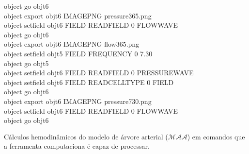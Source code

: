 \documentclass[a4paper,12pt]{monografia}
\theoremstyle{plain}
\theoremstyle{definition}
\theoremstyle{remark}
\begin{document}
\begin{appendices}
\begin{algorithm}[H]
{		object go obj\underline{\space\space}t6 \\
		object export obj\underline{\space\space}t6 IMAGE\underline{\space\space}PNG pressure\underline{\space\space}3\underline{\space\space}65.png \\
		object set\underline{\space\space}field obj\underline{\space\space}t6 FIELD READ\underline{\space\space}FIELD 0 FLOW\underline{\space\space}WAVE \\
		object go obj\underline{\space\space}t6 \\
		object export obj\underline{\space\space}t6 IMAGE\underline{\space\space}PNG flow\underline{\space\space}3\underline{\space\space}65.png \\
		object set\underline{\space\space}field obj\underline{\space\space}t5 FIELD FREQUENCY 0 7.30 \\
		object go obj\underline{\space\space}t5 \\
		object set\underline{\space\space}field obj\underline{\space\space}t6 FIELD READ\underline{\space\space}FIELD 0 PRESSURE\underline{\space\space}WAVE \\
		object set\underline{\space\space}field obj\underline{\space\space}t6 FIELD READ\underline{\space\space}CELL\underline{\space\space}TYPE 0 FIELD \\
		object go obj\underline{\space\space}t6 \\
		object export obj\underline{\space\space}t6 IMAGE\underline{\space\space}PNG pressure\underline{\space\space}7\underline{\space\space}30.png \\
		object set\underline{\space\space}field obj\underline{\space\space}t6 FIELD READ\underline{\space\space}FIELD 0 FLOW\underline{\space\space}WAVE \\
		object go obj\underline{\space\space}t6 \\
}
	\caption{Cálculos hemodinâmicos do modelo de árvore arterial ($\mathcal{MAA}$) em comandos que a ferramenta computaciona é capaz de processar.}
\end{algorithm}


\end{appendices}
\end{document}
